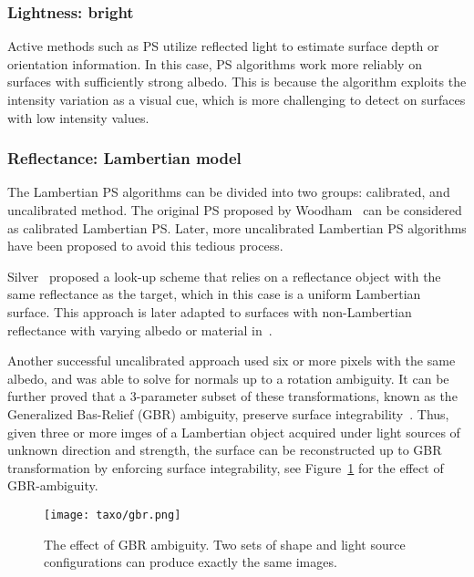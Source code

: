 \subsubsection{Lightness: bright}
Active methods such as PS utilize reflected light to estimate surface depth or orientation information. In this case, PS algorithms work more reliably on surfaces with sufficiently strong albedo. This is because the algorithm exploits the intensity variation as a visual cue, which is more challenging to detect on surfaces with low intensity values.

\subsubsection{Reflectance: Lambertian model} %
The Lambertian PS algorithms can be divided into two groups: calibrated, and uncalibrated method. The original PS proposed by Woodham~\cite{woodham1980photometric} can be considered as calibrated Lambertian PS. Later, more uncalibrated Lambertian PS algorithms have been proposed to avoid this tedious process.

Silver~\cite{silver1980determining} proposed a look-up scheme that relies on a reflectance object with the same reflectance as the target, which in this case is a uniform Lambertian surface. This approach is later adapted to surfaces with non-Lambertian reflectance with varying albedo or material in~\cite{hertzmann2005example}.

Another successful uncalibrated approach used six or more pixels with the same albedo, and was able to solve for normals up to a rotation ambiguity\cite{hayakawa1994photometric}. It can be further proved that a 3-parameter subset of these transformations, known as the Generalized Bas-Relief (GBR) ambiguity, preserve surface integrability~\cite{belhumeur1999bas}. Thus, given three or more imges of a Lambertian object acquired under light sources of unknown direction and strength, the surface can be reconstructed up to GBR transformation by enforcing surface integrability, see Figure~\ref{fig:gbr} for the effect of GBR-ambiguity.
\begin{figure}[!htbp]
\centering
\texttt{[image: taxo/gbr.png]}
\caption{The effect of GBR ambiguity. Two sets of shape and light source configurations can produce exactly the same images.}
\label{fig:gbr}
\end{figure}


